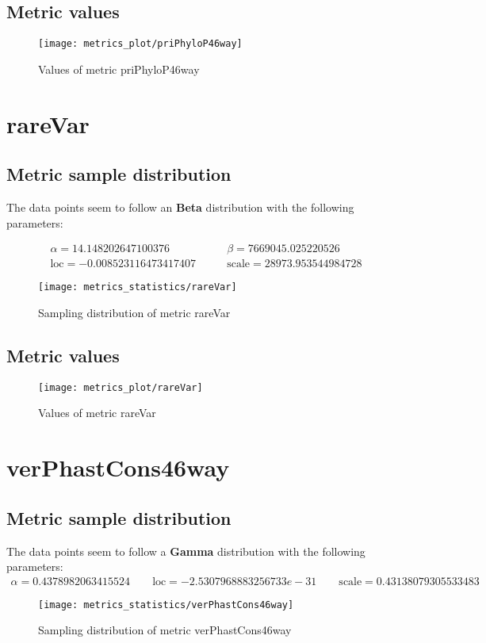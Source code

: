 \subsection{Metric values}
\begin{figure}
	\texttt{[image: metrics\_plot/priPhyloP46way]}
	\caption{Values of metric priPhyloP46way}
\end{figure}

\clearpage
\section{rareVar}
\subsection{Metric sample distribution}
The data points seem to follow an \textbf{Beta} distribution with the following parameters:

\begin{align*}
	\alpha   = 14.148202647100376      & \qquad  \beta = 7669045.025220526        \\
	\text{loc} = -0.008523116473417407 & \qquad \text{scale} = 28973.953544984728
\end{align*}
\begin{figure}
	\texttt{[image: metrics\_statistics/rareVar]}
	\caption{Sampling distribution of metric rareVar}
\end{figure}
\subsection{Metric values}
\begin{figure}
	\texttt{[image: metrics\_plot/rareVar]}
	\caption{Values of metric rareVar}
\end{figure}

\clearpage
\section{verPhastCons46way}
\subsection{Metric sample distribution}
The data points seem to follow a \textbf{Gamma} distribution with the following parameters:
\begin{align*}
	\alpha   = 0.4378982063415524    \qquad  \text{loc} = -2.5307968883256733e-31 \qquad \text{scale} = 0.43138079305533483
\end{align*}
\begin{figure}
	\texttt{[image: metrics\_statistics/verPhastCons46way]}
	\caption{Sampling distribution of metric verPhastCons46way}
\end{figure}
